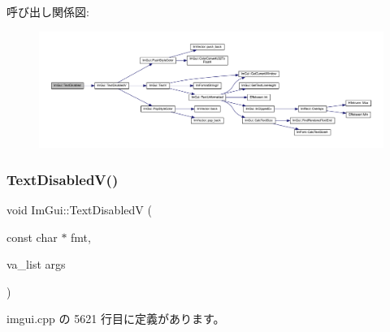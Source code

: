 呼び出し関係図\+:\nopagebreak
\begin{figure}[H]
\begin{center}
\leavevmode
\includegraphics[width=350pt]{namespace_im_gui_aa96bf14c5fa288e106820aeb4ba7fcb6_cgraph}
\end{center}
\end{figure}
\mbox{\label{namespace_im_gui_a5b128d4f12d7e33e95fb9cef7dce027e}} 
\subsubsection{\texorpdfstring{Text\+Disabled\+V()}{TextDisabledV()}}
{\footnotesize\ttfamily void Im\+Gui\+::\+Text\+DisabledV (\begin{DoxyParamCaption}\item[{const char $\ast$}]{fmt,  }\item[{va\+\_\+list}]{args }\end{DoxyParamCaption})}



 imgui.\+cpp の 5621 行目に定義があります。

